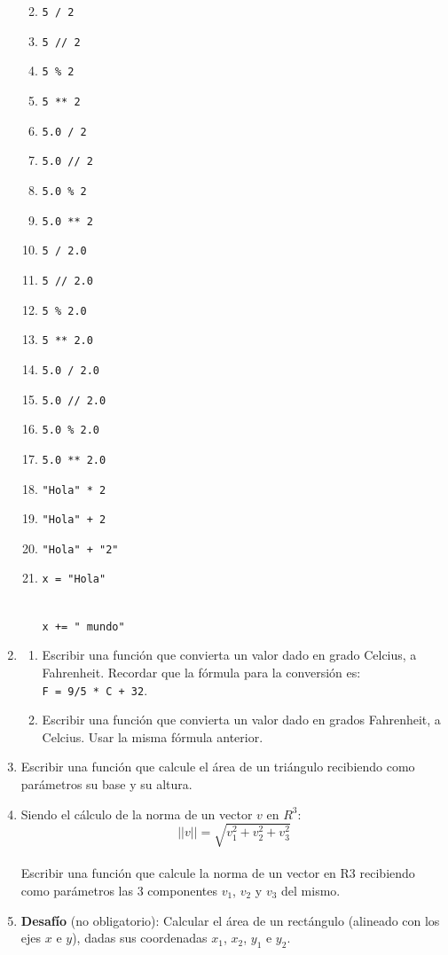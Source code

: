 \documentclass[
  letterpaper,
  DIV=11,
  numbers=noendperiod]{scrreprt}
\providecommand{\tightlist}{%
  \setlength{\itemsep}{0pt}\setlength{\parskip}{0pt}}\usepackage{longtable,booktabs,array}
\begin{document}
\begin{enumerate}
  \begin{enumerate}
  \def\labelenumii{\alph{enumii}.}
  \tightlist
  \item
    \texttt{5\ /\ 2}
  \item
    \texttt{5\ //\ 2}
  \item
    \texttt{5\ \%\ 2}
  \item
    \texttt{5\ **\ 2}
  \item
    \texttt{5.0\ /\ 2}
  \item
    \texttt{5.0\ //\ 2}
  \item
    \texttt{5.0\ \%\ 2}
  \item
    \texttt{5.0\ **\ 2}
  \item
    \texttt{5\ /\ 2.0}
  \item
    \texttt{5\ //\ 2.0}
  \item
    \texttt{5\ \%\ 2.0}
  \item
    \texttt{5\ **\ 2.0}
  \item
    \texttt{5.0\ /\ 2.0}
  \item
    \texttt{5.0\ //\ 2.0}
  \item
    \texttt{5.0\ \%\ 2.0}
  \item
    \texttt{5.0\ **\ 2.0}
  \item
    \texttt{"Hola"\ *\ 2}
  \item
    \texttt{"Hola"\ +\ 2}
  \item
    \texttt{"Hola"\ +\ "2"}
  \item
    \texttt{x\ =\ "Hola"}\strut \\
    \texttt{x\ +=\ "\ mundo"}
  \end{enumerate}
\item
  \begin{enumerate}
  \def\labelenumii{\alph{enumii}.}
  \tightlist
  \item
    Escribir una función que convierta un valor dado en grado Celcius, a
    Fahrenheit. Recordar que la fórmula para la conversión es:
    \texttt{F\ =\ 9/5\ *\ C\ +\ 32}.
  \item
    Escribir una función que convierta un valor dado en grados
    Fahrenheit, a Celcius. Usar la misma fórmula anterior.
  \end{enumerate}
\item
  Escribir una función que calcule el área de un triángulo recibiendo
  como parámetros su base y su altura.
\item
  Siendo el cálculo de la norma de un vector \(v\) en \(R^3\):\\
  \[||v|| = \sqrt{v_1^2 + v_2^2 + v_3^2}\]\\
  Escribir una función que calcule la norma de un vector en R3
  recibiendo como parámetros las 3 componentes \(v_1\), \(v_2\) y
  \(v_3\) del mismo.
\item
  \textbf{Desafío} (no obligatorio): Calcular el área de un rectángulo
  (alineado con los ejes \(x\) e \(y\)), dadas sus coordenadas \(x_1\),
  \(x_2\), \(y_1\) e \(y_2\).
\end{enumerate}
\end{document}
